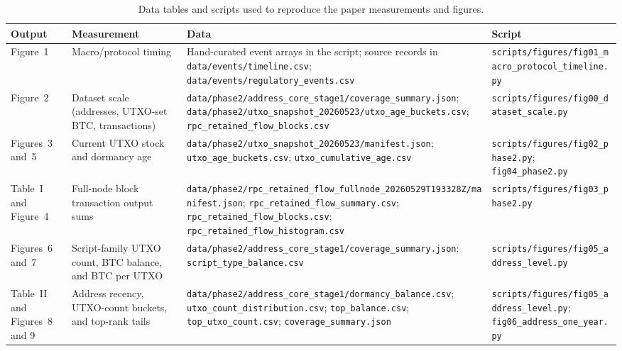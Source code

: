 \documentclass[conference]{IEEEtran}
\providecommand{\paperbibfile}{references}
\newcommand{\datafile}[1]{\nolinkurl{#1}}
\begin{document}
\begin{table}[!tbp]
  \centering
  \scriptsize
  \setlength{\tabcolsep}{3.5pt}
  \renewcommand{\arraystretch}{1.08}
  \begin{tabular}{@{}L{0.16\textwidth}L{0.25\textwidth}L{0.27\textwidth}L{0.22\textwidth}@{}}
    \toprule
    \textbf{Output} & \textbf{Measurement} & \textbf{Data} & \textbf{Script} \\
    \midrule
    Figure~1 & Macro/protocol timing & Hand-curated event arrays in the script; source records in \datafile{data/events/timeline.csv}; \datafile{data/events/regulatory_events.csv} & \datafile{scripts/figures/fig01_macro_protocol_timeline.py} \\
    Figure~2 & Dataset scale (addresses, UTXO-set BTC, transactions) & \datafile{data/phase2/address_core_stage1/coverage_summary.json}; \datafile{data/phase2/utxo_snapshot_20260523/utxo_age_buckets.csv}; \datafile{rpc_retained_flow_blocks.csv} & \datafile{scripts/figures/fig00_dataset_scale.py} \\
    Figures~3 and~5 & Current UTXO stock and dormancy age & \datafile{data/phase2/utxo_snapshot_20260523/manifest.json}; \datafile{utxo_age_buckets.csv}; \datafile{utxo_cumulative_age.csv} & \datafile{scripts/figures/fig02_phase2.py}; \datafile{fig04_phase2.py} \\
    Table~I and Figure~4 & Full-node block transaction output sums & \datafile{data/phase2/rpc_retained_flow_fullnode_20260529T193328Z/manifest.json}; \datafile{rpc_retained_flow_summary.csv}; \datafile{rpc_retained_flow_blocks.csv}; \datafile{rpc_retained_flow_histogram.csv} & \datafile{scripts/figures/fig03_phase2.py} \\
    Figures~6 and~7 & Script-family UTXO count, BTC balance, and BTC per UTXO & \datafile{data/phase2/address_core_stage1/coverage_summary.json}; \datafile{script_type_balance.csv} & \datafile{scripts/figures/fig05_address_level.py} \\
    Table~II and Figures~8 and 9 & Address recency, UTXO-count buckets, and top-rank tails & \datafile{data/phase2/address_core_stage1/dormancy_balance.csv}; \datafile{utxo_count_distribution.csv}; \datafile{top_balance.csv}; \datafile{top_utxo_count.csv}; \datafile{coverage_summary.json} & \datafile{scripts/figures/fig05_address_level.py}; \datafile{fig06_address_one_year.py} \\
    \bottomrule
  \end{tabular}
  \vspace{1em}
  \caption{Data tables and scripts used to reproduce the paper measurements and figures.}
  \label{tab:repro-sources}
\end{table}




\end{document}

